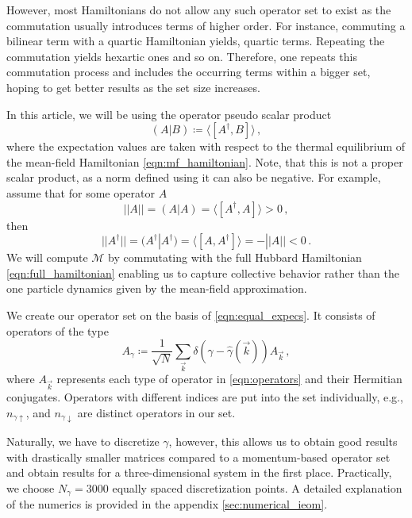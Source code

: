 \documentclass[
    reprint, 
    aps,
    preprintnumbers,
    twocolumn,
    prb,
    superscriptaddress
]{revtex4-2}
\newcommand{\vk}{\vec{k}}
\newcommand{\up}{\uparrow}
\newcommand{\down}{\downarrow}
\newcommand{\mM}{\mathcal{M}}
\begin{document}
However, most Hamiltonians do not allow any such operator set to exist as the commutation usually introduces terms of higher order.
For instance, commuting a bilinear term with a quartic Hamiltonian yields, quartic terms. Repeating the commutation yields hexartic ones and so on.
Therefore, one repeats this commutation process and includes the occurring terms within a bigger set,
hoping to get better results as the set size increases.

In this article, we will be using the operator pseudo scalar product
\begin{equation}
\label{eqn:scalar_product}
    (A | B) \coloneqq  \langle [A^\dagger, B] \rangle\,,
\end{equation}
where the expectation values are taken with respect to the thermal equilibrium of the mean-field Hamiltonian \eqref{eqn:mf_hamiltonian}.
Note, that this is not a proper scalar product, as a norm defined using it can also be negative.
For example, assume that for some operator $A$
\begin{equation}
    ||A|| = (A | A) = \langle [A^\dagger, A] \rangle > 0\,,
\end{equation}
then
\begin{equation}
    ||A^\dagger|| = (A^\dagger | A^\dagger) = \langle [A, A^\dagger] \rangle = - ||A|| < 0\,.
\end{equation}
We will compute $\mM$ by commutating with the full Hubbard Hamiltonian \eqref{eqn:full_hamiltonian} enabling us to capture collective behavior rather than the one particle dynamics given by the mean-field approximation.

We create our operator set on the basis of \eqref{eqn:equal_expecs}.
It consists of operators of the type
\begin{equation}
    \label{eqn:ieom_basis_operator}
    A_\gamma \coloneqq \frac{1}{\sqrt{N}} \sum_{\vk} \delta (\gamma - \hat{\gamma}( \vk )) A_{\vk}\,,
\end{equation}
where $A_{\vk}$ represents each type of operator in \eqref{eqn:operators} and their Hermitian conjugates.
Operators with different indices are put into the set individually, e.g., $n_{\gamma \up}$, and $n_{\gamma \down}$ are distinct operators in our set.

Naturally, we have to discretize $\gamma$, 
however, this allows us to obtain good results with drastically smaller matrices compared to a momentum-based operator set and obtain results for a three-dimensional system in the first place.
Practically, we choose $N_\gamma = 3000$ equally spaced discretization points.
A detailed explanation of the numerics is provided in the appendix \autoref{sec:numerical_ieom}.
\end{document}
